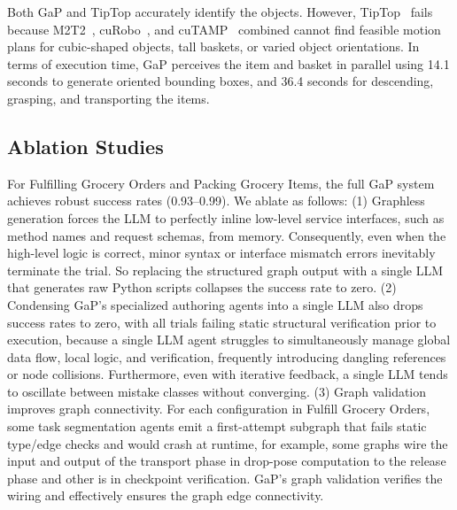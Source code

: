 Both GaP and TipTop accurately identify the objects. However, TipTop~\cite{shen2026tiptop} fails because M2T2~\cite{yuan2023m2t2}, cuRobo~\cite{sundaralingam2023curobo}, and cuTAMP~\cite{shen2024differentiable} combined cannot find feasible motion plans for cubic-shaped objects, tall baskets, or varied object orientations.
In terms of execution time, GaP perceives the item and basket in parallel using 14.1 seconds to generate oriented bounding boxes, and 36.4 seconds for descending, grasping, and transporting the items.

\subsection{Ablation Studies}
For Fulfilling Grocery Orders and Packing Grocery Items, the full GaP system achieves robust success rates (0.93–0.99). We ablate as follows: (1) Graphless generation forces the LLM to perfectly inline low-level service interfaces, such as method names and request schemas, from memory. Consequently, even when the high-level logic is correct, minor syntax or interface mismatch errors inevitably terminate the trial.  So replacing the structured graph output with a single LLM that generates raw Python scripts collapses the success rate to zero.
(2) Condensing GaP's specialized authoring agents into a single LLM also drops success rates to zero, with all trials failing static structural verification prior to execution, because a single LLM agent struggles to simultaneously manage global data flow, local logic, and verification, frequently introducing dangling references or node collisions. Furthermore, even with iterative feedback, a single LLM tends to oscillate between mistake classes without converging. 
(3) {Graph validation improves graph connectivity}. For each configuration in Fulfill Grocery Orders, some task segmentation agents emit a first-attempt subgraph that fails static type/edge checks and would crash at runtime, for example, some graphs wire the input and output of the {transport} phase in drop-pose computation to the release phase and other is in checkpoint verification. GaP's graph validation verifies the wiring and effectively ensures the graph edge connectivity.




